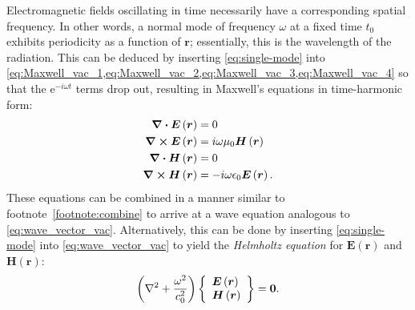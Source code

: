 Electromagnetic fields oscillating in time necessarily have a corresponding spatial frequency. 
In other words, a normal mode of frequency $\omega$ at a fixed time $t_0$ exhibits periodicity as a function of $\mathbold{r}$; essentially, this is the wavelength of the radiation.  
This can be deduced by inserting \cref{eq:single-mode} into \cref{eq:Maxwell_vac_1,eq:Maxwell_vac_2,eq:Maxwell_vac_3,eq:Maxwell_vac_4} so that the $\mathrm{e}^{-i \omega t}$ terms drop out, resulting in Maxwell's equations in time-harmonic form: 
\begin{subequations}
\begin{align} %
 \div \mathbold{E} \left( \mathbold{r} \right) &= 0 \label{eq:Maxwell_vac_TH_1} \\
 \curl \mathbold{E} \left( \mathbold{r} \right) &= i \omega \mu_0 \mathbold{H} \left( \mathbold{r} \right) \label{eq:Maxwell_vac_TH_3} \\
 \div \mathbold{H} \left( \mathbold{r} \right) &= 0 \label{eq:Maxwell_vac_TH_2} \\
 \curl \mathbold{H} \left( \mathbold{r} \right) &= -i \omega \epsilon_0 \mathbold{E} \left( \mathbold{r} \right) \label{eq:Maxwell_vac_TH_4} .
 \end{align}
\end{subequations}
These equations can be combined in a manner similar to footnote~\ref{footnote:combine} to arrive at a wave equation analogous to \cref{eq:wave_vector_vac}. 
Alternatively, this can be done by inserting \cref{eq:single-mode} into \cref{eq:wave_vector_vac} to yield the \emph{Helmholtz equation} for $\mathbold{E}(\mathbold{r})$ and $\mathbold{H}(\mathbold{r})$: %
\begin{equation} \label{eq:Helmholtz}
 \left( \laplacian + \frac{\omega^2}{c_0^2} \right) \left\{
 \begin{array}{lr}
 \mathbold{E} \left( \mathbold{r} \right) \\
 \mathbold{H} \left( \mathbold{r} \right)
 \end{array}
 \right\} = \mathbf{0} .
 \end{equation} 

